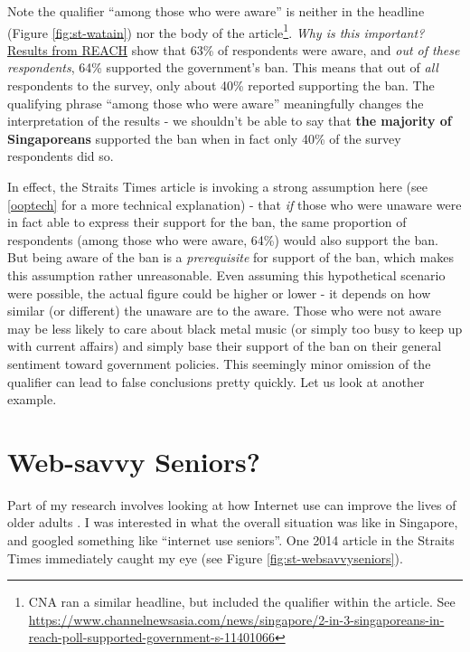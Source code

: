 \documentclass[
  openany]{book}
\begin{document}
Note the qualifier ``among those who were aware'' is neither in the headline (Figure \ref{fig:st-watain}) nor the body of the article\footnote{CNA ran a similar headline, but included the qualifier within the article. See \url{https://www.channelnewsasia.com/news/singapore/2-in-3-singaporeans-in-reach-poll-supported-government-s-11401066}}. \emph{Why is this important?} \href{https://www.reach.gov.sg/~/media/2019/press-release/findings-of-poll-on-watain-concert--1-april-2019.pdf}{Results from REACH} show that 63\% of respondents were aware, and \emph{out of these respondents}, 64\% supported the government's ban. This means that out of \emph{all} respondents to the survey, only about 40\% reported supporting the ban. The qualifying phrase ``among those who were aware'' meaningfully changes the interpretation of the results - we shouldn't be able to say that \textbf{the majority of Singaporeans} supported the ban when in fact only 40\% of the survey respondents did so.

In effect, the Straits Times article is invoking a strong assumption here (see \ref{ooptech} for a more technical explanation) - that \emph{if} those who were unaware were in fact able to express their support for the ban, the same proportion of respondents (among those who were aware, 64\%) would also support the ban. But being aware of the ban is a \emph{prerequisite} for support of the ban, which makes this assumption rather unreasonable. Even assuming this hypothetical scenario were possible, the actual figure could be higher or lower - it depends on how similar (or different) the unaware are to the aware. Those who were not aware may be less likely to care about black metal music (or simply too busy to keep up with current affairs) and simply base their support of the ban on their general sentiment toward government policies. This seemingly minor omission of the qualifier can lead to false conclusions pretty quickly. Let us look at another example.

\hypertarget{websavvy}{%
\section{Web-savvy Seniors?}\label{websavvy}}

Part of my research involves looking at how Internet use can improve the lives of older adults \citep[see][]{ang_going_2018}. I was interested in what the overall situation was like in Singapore, and googled something like ``internet use seniors''. One 2014 article in the Straits Times immediately caught my eye (see Figure \ref{fig:st-websavvyseniors}).
\end{document}

